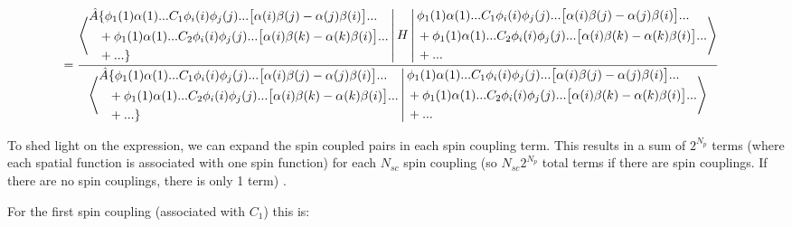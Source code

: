 \documentclass[a4paper]{article}
\begin{document}
 \begin{equation}
 \begin{aligned}
     &= \frac{  \Braket{   \begin{aligned}
     \hat{A}& \{ \phi_1(1)\alpha(1)... C_1 \phi_i(i) \phi_j(j)... \big[\alpha(i)\beta(j)-\alpha(j)\beta(i)\big]... \\ &
 + \phi_1(1)\alpha(1)... C_2\phi_i(i) \phi_j(j) ...  \big[\alpha(i)\beta(k)-\alpha(k)\beta(i)\big] ... \\ &+ ...\} 
       \end{aligned}
       |H|
  \begin{aligned}
     &  \phi_1(1)\alpha(1)... C_1 \phi_i(i) \phi_j(j) ... \big[\alpha(i)\beta(j)-\alpha(j)\beta(i)\big]... \\ &
 + \phi_1(1)\alpha(1)... C_2\phi_i(i) \phi_j(j) ...  \big[\alpha(i)\beta(k)-\alpha(k)\beta(i)\big] ... \\ &+ ... 
       \end{aligned}
         }}
       {\Braket{  \begin{aligned}
     \hat{A}& \{ \phi_1(1)\alpha(1)... C_1 \phi_i(i) \phi_j(j)... \big[\alpha(i)\beta(j)-\alpha(j)\beta(i)\big]... \\ &
 + \phi_1(1)\alpha(1)... C_2\phi_i(i) \phi_j(j) ...  \big[\alpha(i)\beta(k)-\alpha(k)\beta(i)\big] ... \\ &+ ...\} 
       \end{aligned}
              |
               \begin{aligned}
     & \phi_1(1)\alpha(1)... C_1 \phi_i(i) \phi_j(j)... \big[\alpha(i)\beta(j)-\alpha(j)\beta(i)\big]... \\ &
 + \phi_1(1)\alpha(1)... C_2\phi_i(i) \phi_j(j) ...  \big[\alpha(i)\beta(k)-\alpha(k)\beta(i)\big] ... \\ &+ ... 
       \end{aligned}
       }} 
     \end{aligned}
     \end{equation}
     
To shed light on the expression, we can expand the spin coupled pairs in each spin coupling term. This results in a sum of $2^{N_p}$ terms 
(where each spatial function is associated with one spin function) for each $N_{sc}$ spin coupling (so $N_{sc}2^{N_{p}}$ total terms if there are spin couplings. If there are no spin couplings, there is only 1 term) .

For the first spin coupling (associated with $C_1$) this is:
\end{document}
